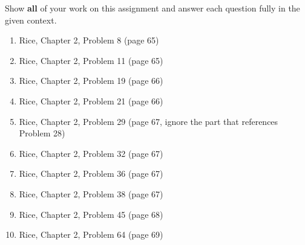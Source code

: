 \documentclass[11pt]{article}
\newcommand{\ben}{\begin{enumerate}}
\newcommand{\een}{\end{enumerate}}
\begin{document}
\pagestyle{fancy} 

Show \textbf{all} of your work on this assignment and answer each question fully in the given context.

\ben

\item Rice, Chapter 2, Problem 8 (page 65)

\item Rice, Chapter 2, Problem 11 (page 65)

\item Rice, Chapter 2, Problem 19 (page 66)

\item Rice, Chapter 2, Problem 21 (page 66)

\item Rice, Chapter 2, Problem 29 (page 67, ignore the part that references Problem 28)

\item Rice, Chapter 2, Problem 32 (page 67)

\item Rice, Chapter 2, Problem 36 (page 67)

\item Rice, Chapter 2, Problem 38 (page 67)

\item Rice, Chapter 2, Problem 45 (page 68)

\item Rice, Chapter 2, Problem 64 (page 69)
\een
\end{document}
